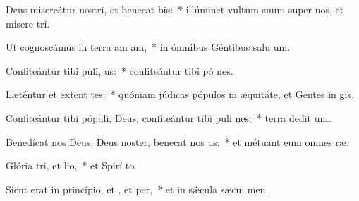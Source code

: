 \item Deus misereátur nostri, et benecat bis:~* illúminet vultum suum super nos, et misere tri.
\item Ut cognoscámus in terra am am,~* in ómnibus Géntibus salu um.
\item Confiteántur tibi puli, us:~* confiteántur tibi pó nes.
\item Læténtur et extent tes:~* quóniam júdicas pópulos in æquitáte, et Gentes in  gis.
\item Confiteántur tibi pópuli, Deus, confiteántur tibi puli nes:~* terra dedit  um.
\item Benedícat nos Deus, Deus noster, benecat nos us:~* et métuant eum omnes  ræ.
\item Glória tri, et lio,~* et Spirí to.
\item Sicut erat in princípio, et , et per,~* et in sǽcula sæcu. men.

